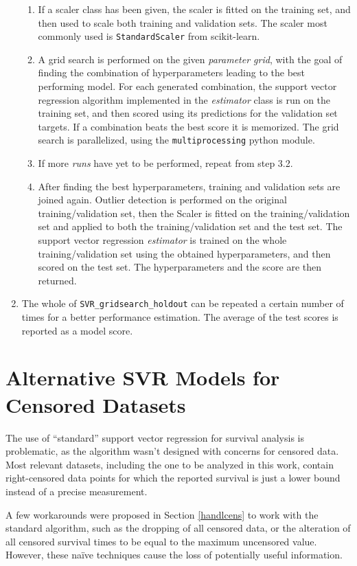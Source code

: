 \documentclass[12pt]{report}
\begin{document}
\begin{enumerate}
\begin{enumerate}
\item If a scaler class has been given, the scaler is fitted on the training set, and then used to scale both training and validation sets. The scaler most commonly used is \texttt{StandardScaler} from scikit-learn.
\item A grid search is performed on the given \textit{parameter grid}, with the goal of finding the combination of hyperparameters leading to the best performing model. For each generated combination, the support vector regression algorithm implemented in the \textit{estimator} class is run on the training set, and then scored using its predictions for the validation set targets. If a combination beats the best score it is memorized. The grid search is parallelized, using the \texttt{multiprocessing} python module.
\item If more \textit{runs} have yet to be performed, repeat from step 3.2.
\item After finding the best hyperparameters, training and validation sets are joined again. Outlier detection is performed on the original training/validation set, then the Scaler is fitted on the training/validation set and applied to both the training/validation set and the test set. The support vector regression \textit{estimator} is trained on the whole training/validation set using the obtained hyperparameters, and then scored on the test set. The hyperparameters and the score are then returned.
\end{enumerate}
\item The whole of \texttt{SVR\_gridsearch\_holdout} can be repeated a certain number of times for a better performance estimation. The average of the test scores is reported as a model score.
\end{enumerate}

\chapter{Alternative SVR Models for Censored Datasets}
\label{chaltsvr}
The use of ``standard'' support vector regression for survival analysis is problematic, as the algorithm wasn't designed with concerns for censored data. Most relevant datasets, including the one to be analyzed in this work, contain right-censored data points for which the reported survival is just a lower bound instead of a precise measurement.

A few workarounds were proposed in Section \ref{handlcens} to work with the standard algorithm, such as the dropping of all censored data, or the alteration of all censored survival times to be equal to the maximum uncensored value. However, these naïve techniques cause the loss of potentially useful information.
\end{document}
